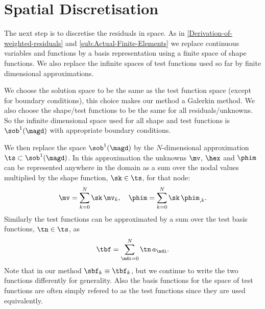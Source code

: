 \section{Spatial Discretisation}
\label{ll-sec:spat-discr-resi}

The next step is to discretise the residuals in space. As in \cref{Derivation-of-weighted-residuals} and \ref{sub:Actual-Finite-Elements} we replace continuous variables and functions by a basis representation using a finite space of shape functions. We also replace the infinite spaces of test functions used so far by finite dimensional approximations.

We choose the solution space to be the same as the test function space (except for boundary conditions), this choice makes our method a Galerkin method. We also choose the shape/test functions to be the same for all residuals/unknowns. So the infinite dimensional space used for all shape and test functions is $\sob^1(\magd)$ with appropriate boundary conditions.

We then replace the space $\sob^1(\magd)$ by the $N$-dimensional approximation $\ts \subset \sob^1(\magd)$. In this approximation the unknowns $\mv$, $\hex$ and $\phim$ can be represented anywhere in the domain as a sum over the nodal values multiplied by the shape function, $\sk \in \ts$, for that node:
\begin{gather} %
  \mv = \sum_{k = 0}^{N} \sk \, \mv_k, \quad
  \phim = \sum_{k = 0}^{N} \sk \, \phim_{,k}.
  \label{ll-eq:unknowns-basis}
\end{gather}
Similarly the test functions can be approximated by a sum over the test basis functions, $\tn \in \ts$, as
\begin{equation}
  \label{ll-eq:47}
  \tbf = \sum_{\ndi = 0}^{N} \tn \, a_\ndi.
\end{equation}
Note that in our method $\sbf_k \equiv \tbf_k$, but we continue to write the two functions differently for generality. Also the basis functions for the space of test functions are often simply refered to as the test functions since they are used equivalently.

